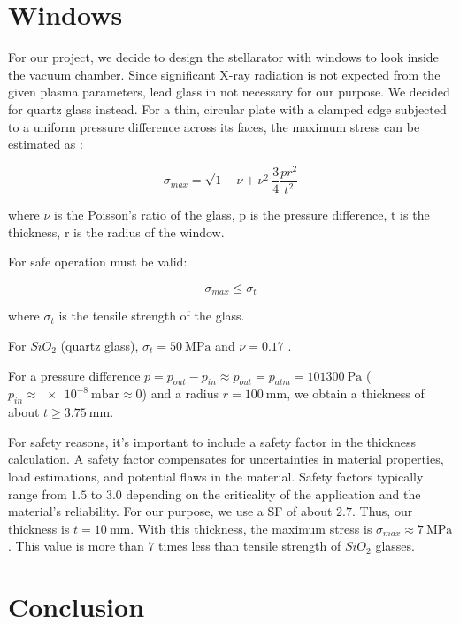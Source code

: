 \section{Windows}

For our project, we decide to design the stellarator with windows to look inside the vacuum chamber. Since significant X-ray radiation is not expected from the given plasma parameters, lead glass in not necessary for our purpose.
We decided for quartz glass instead.
For a thin, circular plate with a clamped edge subjected to a uniform pressure difference across its faces, the maximum stress can be estimated as \cite{glass, elast, stress}:

\begin{equation}
      \sigma_{max}=\sqrt{1-\nu+\nu^2} \frac{3}{4} \frac{p r^2}{t^2}
\end{equation}

where $\nu$ is the Poisson's ratio of the glass, p is the pressure difference, t is the thickness, r is the radius of the window.

For safe operation must be valid:

\begin{equation}
      \sigma_{max} \leq \sigma_{t}
\end{equation}

where $\sigma_{t}$ is the tensile strength of the glass.

For $SiO_{2}$ (quartz glass), $\sigma_{t} = \SI{50}{\mega\pascal}$ and $\nu = 0.17$ \cite{quartz}.

For a pressure difference $ p = p_{out}-p_{in} \approx p_{out} = p_{atm} = \SI{101300}{\pascal}$ ($p_{in} \approx \SI{e-8}{\milli\bar} \approx 0$) and a radius $ r = \SI{100}{\milli\meter} $, we obtain a thickness of about $t \geq \SI{3.75}{\milli\meter}$.

For safety reasons, it's important to include a safety factor in the thickness calculation.
A safety factor compensates for uncertainties in material properties, load estimations, and potential flaws in the material.
Safety factors typically range from $1.5$ to $3.0$ depending on the criticality of the application and the material's reliability.
For our purpose, we use a SF of about $2.7$.
Thus, our thickness is $t = \SI{10}{\milli\meter}$.
With this thickness, the maximum stress is  $\sigma_{max} \approx \SI{7}{\mega\pascal}$.
This value is more than $7$ times less than tensile strength of $SiO_{2}$ glasses.

\section{Conclusion}

